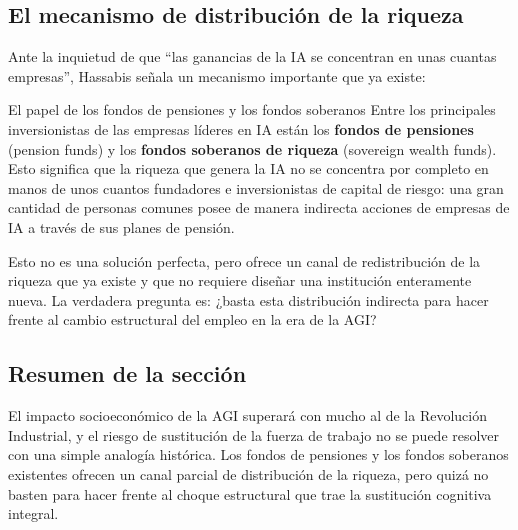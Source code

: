 \subsection{El mecanismo de distribución de la riqueza}

Ante la inquietud de que ``las ganancias de la IA se concentran en unas cuantas empresas'', Hassabis señala un mecanismo importante que ya existe:

\begin{knowledgebox}{El papel de los fondos de pensiones y los fondos soberanos}
Entre los principales inversionistas de las empresas líderes en IA están los \textbf{fondos de pensiones} (pension funds) y los \textbf{fondos soberanos de riqueza} (sovereign wealth funds). Esto significa que la riqueza que genera la IA no se concentra por completo en manos de unos cuantos fundadores e inversionistas de capital de riesgo: una gran cantidad de personas comunes posee de manera indirecta acciones de empresas de IA a través de sus planes de pensión.

Esto no es una solución perfecta, pero ofrece un canal de redistribución de la riqueza que ya existe y que no requiere diseñar una institución enteramente nueva. La verdadera pregunta es: ¿basta esta distribución indirecta para hacer frente al cambio estructural del empleo en la era de la AGI?
\end{knowledgebox}

\subsection{Resumen de la sección}

El impacto socioeconómico de la AGI superará con mucho al de la Revolución Industrial, y el riesgo de sustitución de la fuerza de trabajo no se puede resolver con una simple analogía histórica. Los fondos de pensiones y los fondos soberanos existentes ofrecen un canal parcial de distribución de la riqueza, pero quizá no basten para hacer frente al choque estructural que trae la sustitución cognitiva integral.

